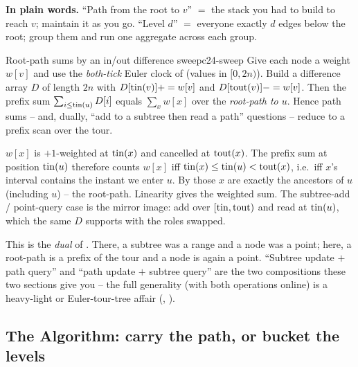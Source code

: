 \noindent\textbf{In plain words.} ``Path from the root to $v$'' $=$ the stack you had to build
to reach $v$; maintain it as you go. ``Level $d$'' $=$ everyone exactly $d$ edges below the
root; group them and run one aggregate across each group.

\begin{proposition}{Root-path sums by an in/out difference sweep}{c24-sweep}
Give each node a weight $w[v]$ and use the \emph{both-tick} Euler clock of 
(values in $[0, 2n)$). Build a difference array $D$ of length $2n$ with $D[\operatorname{tin}(v)] += w[v]$
and $D[\operatorname{tout}(v)] -= w[v]$. Then the prefix sum $\sum_{i \le \operatorname{tin}(u)} D[i]$ equals
$\sum_{x} w[x]$ over the \emph{root-path to $u$}. Hence path sums -- and, dually, ``add to a
subtree then read a path'' questions -- reduce to a prefix scan over the tour.
\end{proposition}
\begin{proofbox}
$w[x]$ is $+1$-weighted at $\operatorname{tin}(x)$ and cancelled at $\operatorname{tout}(x)$. The prefix sum at position
$\operatorname{tin}(u)$ therefore counts $w[x]$ iff $\operatorname{tin}(x) \le \operatorname{tin}(u) < \operatorname{tout}(x)$, i.e.\ iff $x$'s
interval contains the instant we enter $u$. By  those $x$ are exactly the
ancestors of $u$ (including $u$) -- the root-path. Linearity gives the weighted sum. The
subtree-add / point-query case is the mirror image: add over $[\operatorname{tin},\operatorname{tout})$ and read at
$\operatorname{tin}(u)$, which the same $D$ supports with the roles swapped.
\end{proofbox}
\begin{insightbox}
This is the \emph{dual} of . There, a subtree was a range and a node was a
point; here, a root-path is a prefix of the tour and a node is again a point. ``Subtree
update $+$ path query'' and ``path update $+$ subtree query'' are the two compositions these
two sections give you -- the full generality (with both operations online) is a heavy-light
or Euler-tour-tree affair (, ).
\end{insightbox}

\subsection{The Algorithm: carry the path, or bucket the levels}

